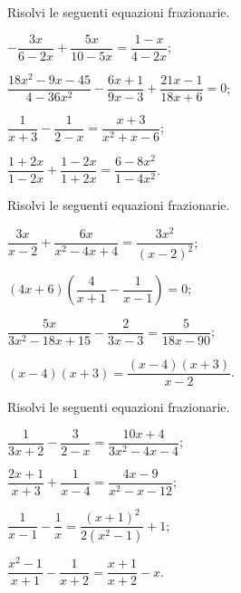 \begin{esercizio}[\Ast]
\label{ese:17.22}
Risolvi le seguenti equazioni frazionarie.
\begin{multicols}{2}
\begin{enumeratea}
\spazielenx
 \item $-{\dfrac{3x}{6-2x}}+\dfrac{5x}{10-5x}=\dfrac{1-x}{4-2x}$;
 \item $\dfrac{18x^{2}-9x-45}{4-36x^{2}}-\dfrac{6x+1}{9x-3}+\dfrac{21x-1}{18x+6}=0$;
 \item $\dfrac{1}{x+3}-\dfrac{1}{2-x}=\dfrac{x+3}{x^{2}+x-6}$;
 \item $\dfrac{1+2x}{1-2x}+\dfrac{1-2x}{1+2x}=\dfrac{6-8x^{2}}{1-4x^{2}}$.
\end{enumeratea}
\end{multicols}
\end{esercizio}

\begin{esercizio}[\Ast]
\label{ese:17.23}
Risolvi le seguenti equazioni frazionarie.
\begin{multicols}{2}
\begin{enumeratea}
\spazielenx
 \item $\dfrac{3x}{x-2}+\dfrac{6x}{x^{2}-4x+4}=\dfrac{3x^{2}}{(x-2)^{2}}$;
 \item $(4x+6)\left(\dfrac{4}{x+1}-\dfrac{1}{x-1}\right)=0$;
 \item $\dfrac{5x}{3x^{2}-18x+15}-\dfrac{2}{3x-3}=\dfrac{5}{18x-90}$;
 \item $(x-4)(x+3)=\dfrac{(x-4)(x+3)}{x-2}$.
\end{enumeratea}
\end{multicols}
\end{esercizio}

\begin{esercizio}[\Ast]
\label{ese:17.24}
Risolvi le seguenti equazioni frazionarie.
\begin{multicols}{2}
\begin{enumeratea}
 \item $\dfrac{1}{3x+2}-\dfrac{3}{2-x}=\dfrac{10x+4}{3x^{2}-4x-4}$;
 \item $\dfrac{2x+1}{x+3}+\dfrac{1}{x-4}=\dfrac{4x-9}{x^{2}-x-12}$;
 \item $\dfrac{1}{x-1}-\dfrac{1}{x}=\dfrac{(x+1)^{2}}{2(x^{2}-1)}+1$;
 \item $\dfrac{x^{2}-1}{x+1}-\dfrac{1}{x+2}=\dfrac{x+1}{x+2}-x$.
\end{enumeratea}
\end{multicols}
\end{esercizio}

